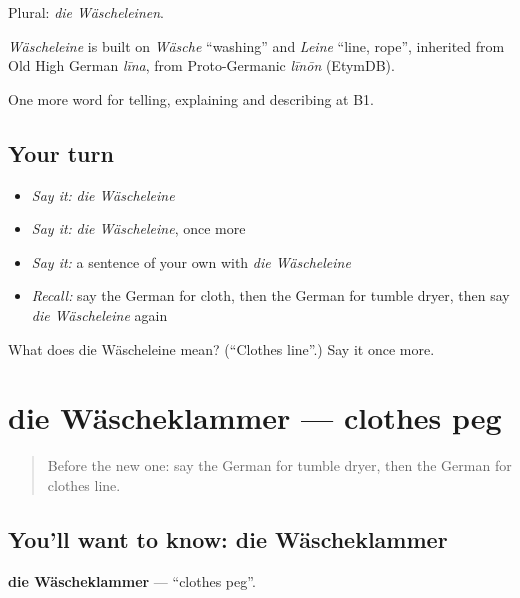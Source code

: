 Plural: \emph{die Wäscheleinen}.

\begin{cousinweb}
\emph{Wäscheleine} is built on \emph{Wäsche} \textquotedblleft{}washing\textquotedblright{} and \emph{Leine} \textquotedblleft{}line, rope\textquotedblright{}, inherited from Old High German \emph{līna}, from Proto-Germanic \emph{līnōn} (EtymDB).
\end{cousinweb}

\begin{grammarlens}[title={What you've built}]
One more word for telling, explaining and describing at B1.
\end{grammarlens}

\subsection*{Your turn}
\begin{itemize}
\raggedright
  \item \emph{Say it:} \emph{die Wäscheleine}
  \item \emph{Say it:} \emph{die Wäscheleine}, once more
  \item \emph{Say it:} a sentence of your own with \emph{die Wäscheleine}
  \item \emph{Recall:} say the German for cloth, then the German for tumble dryer, then say \emph{die Wäscheleine} again
\end{itemize}

\begin{tcolorbox}[breakable,colback=teal!4,colframe=teal!35!black,title={Before you move on}]
What does die Wäscheleine mean? (\textquotedblleft{}Clothes line\textquotedblright{}.) Say it once more.
\end{tcolorbox}
\section[die Wäscheklammer]{die Wäscheklammer — clothes peg}

\label{lesson:GE-C527-waescheklammer}



\begin{quote}
Before the new one: say the German for tumble dryer, then the German for clothes line.
\end{quote}

\subsection*{You'll want to know: die Wäscheklammer}
\textbf{die Wäscheklammer} — \textquotedblleft{}clothes peg\textquotedblright{}.

